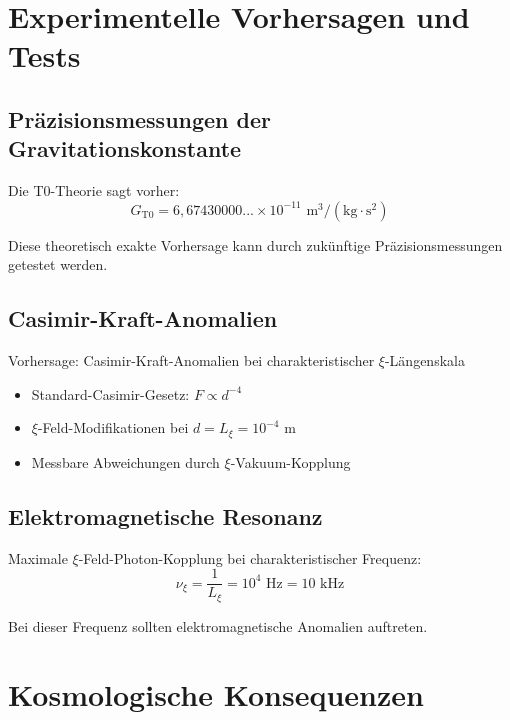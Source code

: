 \documentclass[12pt,a4paper]{article}
\begin{document}
	\section{Experimentelle Vorhersagen und Tests}
	
	\subsection{Präzisionsmessungen der Gravitationskonstante}
	
	Die T0-Theorie sagt vorher:
	\begin{equation}
		G_{\text{T0}} = 6{,}67430000... \times 10^{-11} \text{ m}^3/(\text{kg} \cdot \text{s}^2)
	\end{equation}
	
	Diese theoretisch exakte Vorhersage kann durch zukünftige Präzisionsmessungen getestet werden.
	
	\subsection{Casimir-Kraft-Anomalien}
	
	\begin{experiment}
		Vorhersage: Casimir-Kraft-Anomalien bei charakteristischer $\xi$-Längenskala
		\begin{itemize}
			\item Standard-Casimir-Gesetz: $F \propto d^{-4}$
			\item $\xi$-Feld-Modifikationen bei $d = L_\xi = 10^{-4}$ m
			\item Messbare Abweichungen durch $\xi$-Vakuum-Kopplung
		\end{itemize}
	\end{experiment}
	
	\subsection{Elektromagnetische Resonanz}
	
	Maximale $\xi$-Feld-Photon-Kopplung bei charakteristischer Frequenz:
	\begin{equation}
		\nu_\xi = \frac{1}{L_\xi} = 10^{4} \text{ Hz} = 10 \text{ kHz}
	\end{equation}
	
	Bei dieser Frequenz sollten elektromagnetische Anomalien auftreten.
	
	\section{Kosmologische Konsequenzen}
	
\end{document}
